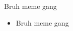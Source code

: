 \begin{list0.5}
    \item Bruh meme gang
\end{list0.5}

\begin{itemize}
    \item Bruh meme gang
\end{itemize}
